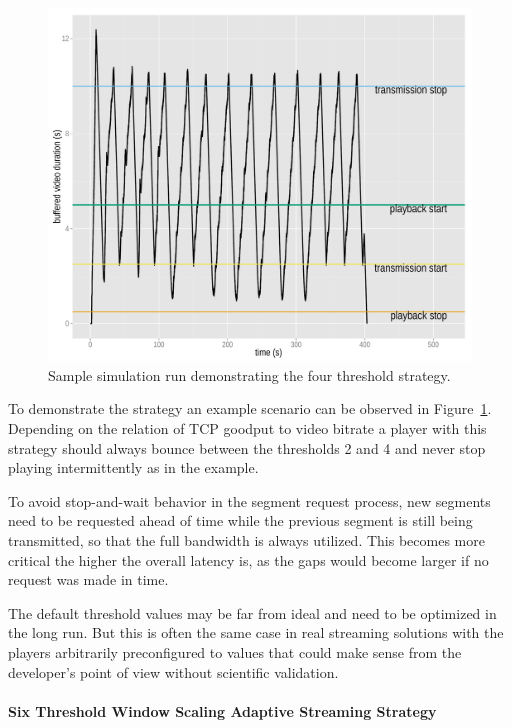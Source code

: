 \begin{figure}[htb]
	\centering
	\includegraphics[width=1.0\textwidth]{images/R-ltesim-plotbuffer-time.pdf}
	\caption{Sample simulation run demonstrating the four threshold strategy.}
\label{c6:fig:ltesim-plotbuffer-time}
\end{figure}

To demonstrate the strategy an example scenario can be observed in Figure~\ref{c6:fig:ltesim-plotbuffer-time}. Depending on the relation of \gls{TCP} goodput to video bitrate a player with this strategy should always bounce between the thresholds 2 and 4 and never stop playing intermittently as in the example.

To avoid stop-and-wait behavior in the segment request process, new segments need to be requested ahead of time while the previous segment is still being transmitted, so that the full bandwidth is always utilized. This becomes more critical the higher the overall latency is, as the gaps would become larger if no request was made in time.

The default threshold values may be far from ideal and need to be optimized in the long run. But this is often the same case in real streaming solutions with the players arbitrarily preconfigured to values that could make sense from the developer's point of view without scientific validation.


\paragraph{Six Threshold Window Scaling Adaptive Streaming Strategy}

